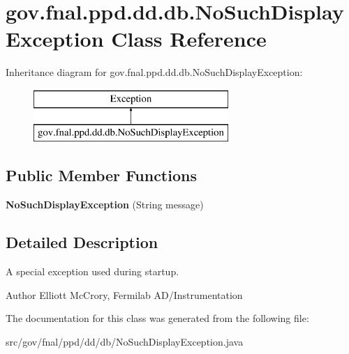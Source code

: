 \hypertarget{classgov_1_1fnal_1_1ppd_1_1dd_1_1db_1_1NoSuchDisplayException}{\section{gov.\-fnal.\-ppd.\-dd.\-db.\-No\-Such\-Display\-Exception Class Reference}
\label{classgov_1_1fnal_1_1ppd_1_1dd_1_1db_1_1NoSuchDisplayException}
}
Inheritance diagram for gov.\-fnal.\-ppd.\-dd.\-db.\-No\-Such\-Display\-Exception\-:\begin{figure}[H]
\begin{center}
\leavevmode
\includegraphics[height=2.000000cm]{classgov_1_1fnal_1_1ppd_1_1dd_1_1db_1_1NoSuchDisplayException}
\end{center}
\end{figure}
\subsection*{Public Member Functions}
\begin{DoxyCompactItemize}
\item 
\hypertarget{classgov_1_1fnal_1_1ppd_1_1dd_1_1db_1_1NoSuchDisplayException_a146774399d8da17cc34caed0f073d072}{{\bfseries No\-Such\-Display\-Exception} (String message)}\label{classgov_1_1fnal_1_1ppd_1_1dd_1_1db_1_1NoSuchDisplayException_a146774399d8da17cc34caed0f073d072}

\end{DoxyCompactItemize}


\subsection{Detailed Description}
A special exception used during startup.

\begin{DoxyAuthor}{Author}
Elliott Mc\-Crory, Fermilab A\-D/\-Instrumentation 
\end{DoxyAuthor}


The documentation for this class was generated from the following file\-:\begin{DoxyCompactItemize}
\item 
src/gov/fnal/ppd/dd/db/No\-Such\-Display\-Exception.\-java\end{DoxyCompactItemize}
